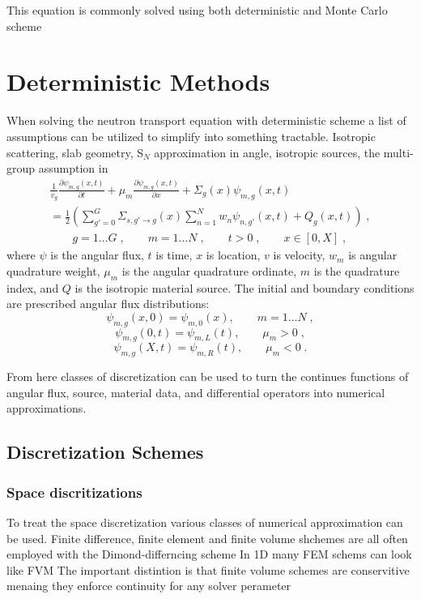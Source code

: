 This equation is commonly solved using both deterministic and Monte Carlo scheme


\section {Deterministic Methods}
When solving the neutron transport equation with deterministic scheme a list of assumptions can be utilized to simplify  into something tractable. Isotropic scattering, slab geometry, S$_N$ approximation in angle, isotropic sources, the multi-group assumption in 
\begin{multline}
    \label{eq:sn_nte}
    \frac{1}{v_g} \frac{\partial \psi_{m,g}(x,t)}{\partial t} + \mu_m \frac{\partial \psi_{m,g}(x,t)}{\partial x} + \Sigma_g(x) \psi_{m,g}(x,t)  \\
     = \frac{1}{2} \left( \sum\limits_{g' = 0}^G \Sigma_{s, g'\to g}(x) \sum\limits_{n=1}^N w_n \psi_{n, g'}(x,t) + Q_g(x,t) \right) \;, \\
    \qquad g=1 \ldots G \;, \qquad m=1 \ldots N \;, \qquad t > 0 \;, \qquad x \in [0,X] \;,
\end{multline}
where $\psi$ is the angular flux, $t$ is time, $x$ is location, $v$ is velocity, $w_m$ is angular quadrature weight, $\mu_m$ is the angular quadrature ordinate, $m$ is the quadrature index, and $Q$ is the isotropic material source.
The initial and boundary conditions are prescribed angular flux distributions:
\begin{equation*}
    \psi_{m,g}(x,0) = \psi_{m,0}(x), \qquad m=1 \ldots N \;,
\end{equation*}
\begin{equation*}
    \psi_{m,g}(0,t) = \psi_{m,L}(t), \qquad \mu_m >0 \;,
\end{equation*}
\begin{equation*}
    \psi_{m,g}(X,t) = \psi_{m,R}(t), \qquad \mu_m <0 \;.
\end{equation*}

From here classes of discretization can be used to turn the continues functions of angular flux, source, material data, and differential operators into numerical approximations.

\subsection{Discretization Schemes}



\subsubsection{Space discritizations}
To treat the space discretization various classes of numerical approximation can be used.
Finite difference, finite element and finite volume shchemes are all often employed with the Dimond-differncing scheme 
In 1D many FEM schems can look like FVM
The important distintion is that finite volume schemes are conservitive menaing they enforce continuity for any solver perameter


